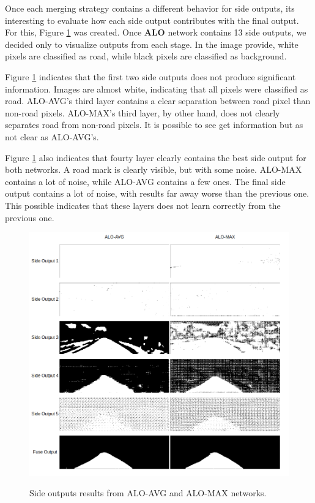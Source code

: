 Once each merging strategy contains a different behavior for side outputs, its interesting to evaluate how each side output contributes with the final output. For this, Figure \ref{fig:side_outputs} was created. Once \textbf{ALO} network contains 13 side outputs, we decided only to visualize outputs from each stage. In the image provide, white pixels are classified as road, while black pixels are classified as background.

Figure \ref{fig:side_outputs} indicates that the first two side outputs does not produce significant information. Images are almost white, indicating that all pixels were classified as road. ALO-AVG's third layer contains a clear separation between road pixel than non-road pixels. ALO-MAX's third layer, by other hand, does not clearly separates road from non-road pixels. It is possible to see get information but as not clear as ALO-AVG's.

Figure \ref{fig:side_outputs} also indicates that fourty layer clearly contains the best side output for both networks. A road mark is clearly visible, but with some noise. ALO-MAX contains a lot of noise, while ALO-AVG contains a few ones. The final side output contains a lot of noise, with results far away worse than the previous one. This possible indicates that these layers does not learn correctly from the previous one.

{\color{red}{Talvez adicionar artigo do Bengio, indicando que é difícil treinar as últimas camadas - tem nos slides do Zenilton de Deep Learning}}

\begin{figure}
  \caption{Side outputs results from ALO-AVG and ALO-MAX networks. \color{red}{Acho q devo treinar a rede ALO-ADD para exibir a saída lateral, melhorando a discussão}}
  \centering
  \includegraphics[width=1.\columnwidth]{figures/falreis/side_outputs.png}
  \label{fig:side_outputs}
\end{figure}

